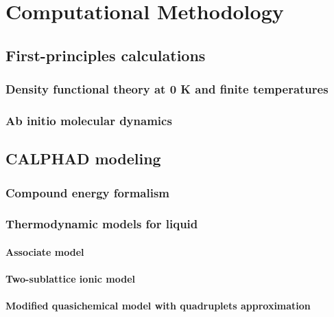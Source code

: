 \chapter{Computational Methodology} \label{chap:method}

\section{First-principles calculations} \label{method:sec:firstprinciples}

\subsection{Density functional theory at 0 K and finite temperatures} \label{method:ssec:dft}

\subsection{Ab initio molecular dynamics} \label{method:ssec:AIMD}

\section{CALPHAD modeling} \label{method:sec:calphad}

\subsection{Compound energy formalism} \label{method:ssec:CEF}

\subsection{Thermodynamic models for liquid} \label{method:ssec:liqmodels}

\subsubsection{Associate model} \label{method:sssec:assm}

\subsubsection{Two-sublattice ionic model} \label{method:sssec:ionic}

\subsubsection{Modified quasichemical model with quadruplets approximation} \label{method:ssec:mqmqa}

